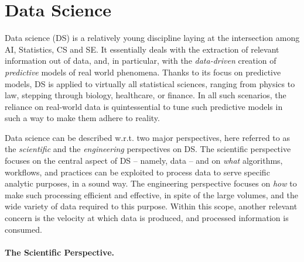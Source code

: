 \documentclass[12pt,a4paper,openright,twoside]{book}
\begin{document}
\section{Data Science}
%

Data science (DS) is a relatively young discipline laying at the intersection among AI, Statistics, CS and SE.
%
It essentially deals with the extraction of relevant information out of data, and, in particular, with the \emph{data-driven} creation of \emph{predictive} models of real world phenomena.
%
Thanks to its focus on predictive models, DS is applied to virtually all statistical sciences, ranging from physics to law, stepping through biology, healthcare, or finance.
%
In all such scenarios, the reliance on real-world data is quintessential to tune such predictive models in such a way to make them adhere to reality.

Data science can be described w.r.t. two major perspectives, here referred to as the \emph{scientific} and the \emph{engineering} perspectives on DS.
%
The scientific perspective focuses on the central aspect of DS -- namely, data -- and on \emph{what} algorithms, workflows, and practices can be exploited to process data to serve specific analytic purposes, in a sound way.
%
The engineering perspective focuses on \emph{how} to make such processing efficient and effective, in spite of the large volumes, and the wide variety of data required to this purpose.
%
Within this scope, another relevant concern is the velocity at which data is produced, and processed information is consumed.

\paragraph{The Scientific Perspective.}
\end{document}
